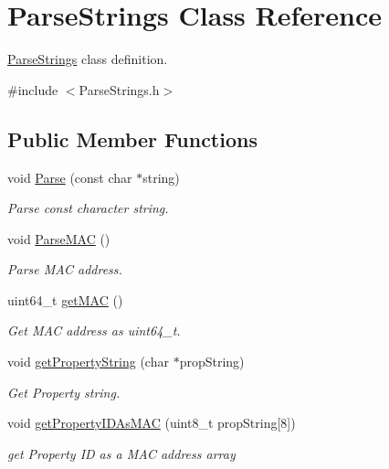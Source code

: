 \hypertarget{classParseStrings}{}\section{Parse\+Strings Class Reference}
\label{classParseStrings}


\hyperlink{classParseStrings}{Parse\+Strings} class definition.  




{\ttfamily \#include $<$Parse\+Strings.\+h$>$}

\subsection*{Public Member Functions}
\begin{DoxyCompactItemize}
\item 
void \hyperlink{classParseStrings_a49f5520441d291626b4d655d20a6ab19}{Parse} (const char $\ast$string)
\begin{DoxyCompactList}\small\item\em Parse const character string. \end{DoxyCompactList}\item 
void \hyperlink{classParseStrings_a1a177dfb6cb057b7709710362b3e10a0}{Parse\+M\+AC} ()
\begin{DoxyCompactList}\small\item\em Parse M\+AC address. \end{DoxyCompactList}\item 
uint64\+\_\+t \hyperlink{classParseStrings_a7b0f8fdd77be81594f0495637de5138c}{get\+M\+AC} ()
\begin{DoxyCompactList}\small\item\em Get M\+AC address as uint64\+\_\+t. \end{DoxyCompactList}\item 
void \hyperlink{classParseStrings_a48fbe6998c3dd4d6bd5a57644a45eb8e}{get\+Property\+String} (char $\ast$prop\+String)
\begin{DoxyCompactList}\small\item\em Get Property string. \end{DoxyCompactList}\item 
void \hyperlink{classParseStrings_a6dbe145425dd08c33444e5ffd9181041}{get\+Property\+I\+D\+As\+M\+AC} (uint8\+\_\+t prop\+String\mbox{[}8\mbox{]})
\begin{DoxyCompactList}\small\item\em get Property ID as a M\+AC address array \end{DoxyCompactList}\item 

\end{DoxyCompactItemize}
